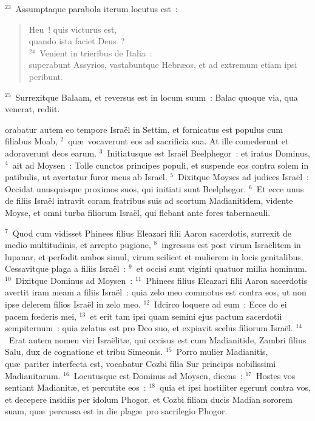 ${}^{23}$~Assumptaque parabola iterum locutus est~: \begin{verse}Heu~! quis victurus est,\\ quando ista faciet Deus~?\\
${}^{24}$~Venient in trieribus de Italia~:\\ superabunt Assyrios, vastabuntque Hebr\ae os, et ad extremum etiam ipsi peribunt.\end{verse}


${}^{25}$~Surrexitque Balaam, et reversus est in locum suum~: Balac quoque via, qua venerat, rediit.

\bchapter
{}orabatur autem eo tempore Isra\"el in Settim, et fornicatus est populus cum filiabus Moab,
${}^{2}$~qu\ae\ vocaverunt eos ad sacrificia sua. At ille comederunt et adoraverunt deos earum.
${}^{3}$~Initiatusque est Isra\"el Beelphegor~: et iratus Dominus,
${}^{4}$~ait ad Moysen~: Tolle cunctos principes populi, et suspende eos contra solem in patibulis, ut avertatur furor meus ab Isra\"el.
${}^{5}$~Dixitque Moyses ad judices Isra\"el~: Occidat unusquisque proximos suos, qui initiati sunt Beelphegor.
${}^{6}$~Et ecce unus de filiis Isra\"el intravit coram fratribus suis ad scortum Madianitidem, vidente Moyse, et omni turba filiorum Isra\"el, qui flebant ante fores tabernaculi.


${}^{7}$~Quod cum vidisset Phinees filius Eleazari filii Aaron sacerdotis, surrexit de medio multitudinis, et arrepto pugione,
${}^{8}$~ingressus est post virum Isra\"elitem in lupanar, et perfodit ambos simul, virum scilicet et mulierem in locis genitalibus. Cessavitque plaga a filiis Isra\"el~:
${}^{9}$~et occisi sunt viginti quatuor millia hominum.
${}^{10}$~Dixitque Dominus ad Moysen~:
${}^{11}$~Phinees filius Eleazari filii Aaron sacerdotis avertit iram meam a filiis Isra\"el~: quia zelo meo commotus est contra eos, ut non ipse delerem filios Isra\"el in zelo meo.
${}^{12}$~Idcirco loquere ad eum~: Ecce do ei pacem fœderis mei,
${}^{13}$~et erit tam ipsi quam semini ejus pactum sacerdotii sempiternum~: quia zelatus est pro Deo suo, et expiavit scelus filiorum Isra\"el.
${}^{14}$~Erat autem nomen viri Isra\"elit\ae , qui occisus est cum Madianitide, Zambri filius Salu, dux de cognatione et tribu Simeonis.
${}^{15}$~Porro mulier Madianitis, qu\ae\ pariter interfecta est, vocabatur Cozbi filia Sur principis nobilissimi Madianitarum.
${}^{16}$~Locutusque est Dominus ad Moysen, dicens~:
${}^{17}$~Hostes vos sentiant Madianit\ae , et percutite eos~:
${}^{18}$~quia et ipsi hostiliter egerunt contra vos, et decepere insidiis per idolum Phogor, et Cozbi filiam ducis Madian sororem suam, qu\ae\ percussa est in die plag\ae\ pro sacrilegio Phogor.

